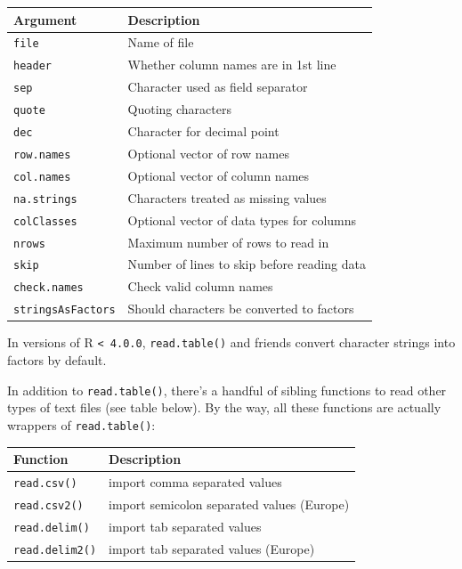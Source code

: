 \documentclass[
]{book}
\begin{document}
\begin{longtable}[]{@{}ll@{}}
\toprule()
Argument & Description \\
\midrule()
\endhead
\texttt{file} & Name of file \\
\texttt{header} & Whether column names are in 1st line \\
\texttt{sep} & Character used as field separator \\
\texttt{quote} & Quoting characters \\
\texttt{dec} & Character for decimal point \\
\texttt{row.names} & Optional vector of row names \\
\texttt{col.names} & Optional vector of column names \\
\texttt{na.strings} & Characters treated as missing values \\
\texttt{colClasses} & Optional vector of data types for columns \\
\texttt{nrows} & Maximum number of rows to read in \\
\texttt{skip} & Number of lines to skip before reading data \\
\texttt{check.names} & Check valid column names \\
\texttt{stringsAsFactors} & Should characters be converted to factors \\
\bottomrule()
\end{longtable}

In versions of R \texttt{\textless{}\ 4.0.0}, \texttt{read.table()} and friends convert character
strings into factors by default.

In addition to \texttt{read.table()}, there's a handful of sibling functions to
read other types of text files (see table below). By the way, all these
functions are actually wrappers of \texttt{read.table()}:

\begin{longtable}[]{@{}ll@{}}
\toprule()
Function & Description \\
\midrule()
\endhead
\texttt{read.csv()} & import comma separated values \\
\texttt{read.csv2()} & import semicolon separated values (Europe) \\
\texttt{read.delim()} & import tab separated values \\
\texttt{read.delim2()} & import tab separated values (Europe) \\
\bottomrule()
\end{longtable}
\end{document}
